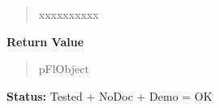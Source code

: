 \begin{boxedminipage}{\funcwidth}
\begin{quote}
\begin{Ventry}{xxxxxxxxxx}
        \end{Ventry}

      \end{quote}

      \textbf{Return Value}
    \vspace{-1ex}

      \begin{quote}
      pFlObject

      \end{quote}

\textbf{Status:} Tested + NoDoc + Demo = OK



    \end{boxedminipage}

    \label{xformslib:flslider:fl_add_valslider}

    \vspace{0.5ex}

